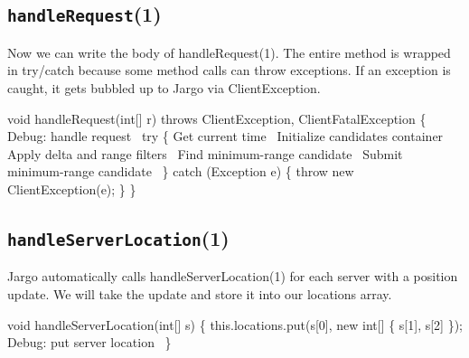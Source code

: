 \subsection{\texttt{handleRequest}(1)}

Now we can write the body of {\Tt{}handleRequest\nwendquote}(1).  The entire method is
wrapped in try/catch because some method calls can throw exceptions. If an
exception is caught, it gets bubbled up to Jargo via {\Tt{}ClientException\nwendquote}.

\nwenddocs{}\endmoddef\nwstartdeflinemarkup{}\nwenddeflinemarkup
void handleRequest(int[] r) throws ClientException, ClientFatalException \{
  \LA{}Debug: handle request~{\nwtagstyle{}}\RA{}
  try \{
    \LA{}Get current time~{\nwtagstyle{}}\RA{}
    \LA{}Initialize candidates container~{\nwtagstyle{}}\RA{}
    \LA{}Apply delta and range filters~{\nwtagstyle{}}\RA{}
    \LA{}Find minimum-range candidate~{\nwtagstyle{}}\RA{}
    \LA{}Submit minimum-range candidate~{\nwtagstyle{}}\RA{}
  \} catch (Exception e) \{
    throw new ClientException(e);
  \}
\}
\nwendcode{}\nwdocspar

\subsection{\texttt{handleServerLocation}(1)}

Jargo automatically calls {\Tt{}handleServerLocation\nwendquote}(1) for each server with
a position update. We will take the update and store it into our {\Tt{}locations\nwendquote}
array.

\nwenddocs{}\endmoddef\nwstartdeflinemarkup{}\nwenddeflinemarkup
void handleServerLocation(int[] s) \{
  this.locations.put(s[0], new int[] \{ s[1], s[2] \});
  \LA{}Debug: put server location~{\nwtagstyle{}}\RA{}
\}
\nwendcode{}\nwdocspar

